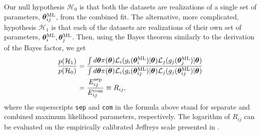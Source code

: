 \documentclass[amsmath, amssymb, reprint, aps]{revtex4-1}
\newcommand{\tv}{\bm{\theta}}
\newcommand{\tML}{\tv^{\rm ML}}
\begin{document}
    Our null hypothesis $\mathcal{H}_0$ is that both the datasets are realizations of a single set of parameters, $\tML_{ij}$, from the combined fit. The alternative, more complicated, hypothesis $\mathcal{H}_1$ is that each of the datasets are realizations of their own set of parameters, $\tML_i, \tML_j$. Then, using the Bayes theorem similarly to the derivation of the Bayes factor, we get
    \begin{equation}
    \begin{aligned}
    \frac{p(\mathcal{H}_1)}{p(\mathcal{H}_0)} &= \frac{\int d\tv \pi(\tv) \mathcal{L}_i(g_i(\tML_i)|\tv) \mathcal{L}_j(g_j(\tML_j)|\tv)}{\int d\tv \pi(\tv) \mathcal{L}_i(g_i(\tML_{ij})|\tv) \mathcal{L}_j(g_j(\tML_{ij})|\tv)} \label{eq:DER} \\
    &= \frac{E_{ij}^{\rm sep}}{{E_{ij}^{\rm com}}} \equiv R_{ij},
    \end{aligned}
    \end{equation}
    where the superscripts \texttt{sep} and \texttt{com} in the formula above stand for separate and combined maximum likelihood parameters, respectively. The logarithm of $R_{ij}$ can be evaluated on the empirically calibrated Jeffreys scale presented in \cite{Trotta:2008qt}.
\end{document}
